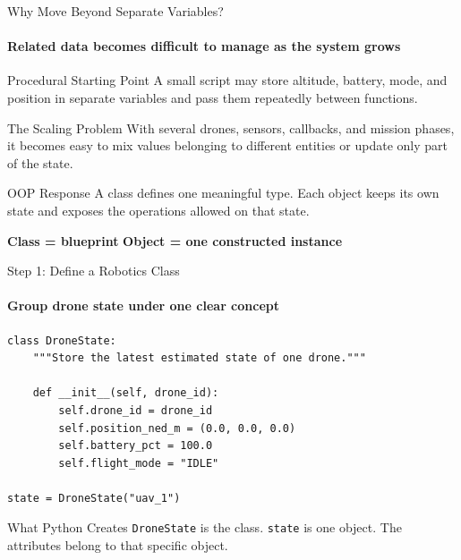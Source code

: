 \begin{frame}{Why Move Beyond Separate Variables?}
\framesubtitle{Related data becomes difficult to manage as the system grows}

\begin{block}{Procedural Starting Point}
    A small script may store altitude, battery, mode, and position in separate
    variables and pass them repeatedly between functions.
\end{block}

\pause

\begin{exampleblock}{The Scaling Problem}
    With several drones, sensors, callbacks, and mission phases, it becomes easy
    to mix values belonging to different entities or update only part of the state.
\end{exampleblock}

\begin{block}{OOP Response}
    A class defines one meaningful type. Each object keeps its own state and
    exposes the operations allowed on that state.
\end{block}

\begin{center}
    \textbf{Class = blueprint}
    \qquad
    \textbf{Object = one constructed instance}
\end{center}
\end{frame}


\begin{frame}[fragile]{Step 1: Define a Robotics Class}
\framesubtitle{Group drone state under one clear concept}

\begin{verbatim}
class DroneState:
    """Store the latest estimated state of one drone."""

    def __init__(self, drone_id):
        self.drone_id = drone_id
        self.position_ned_m = (0.0, 0.0, 0.0)
        self.battery_pct = 100.0
        self.flight_mode = "IDLE"

state = DroneState("uav_1")
\end{verbatim}

\begin{block}{What Python Creates}
    \texttt{DroneState} is the class. \texttt{state} is one object.
    The attributes belong to that specific object.
\end{block}
\end{frame}


